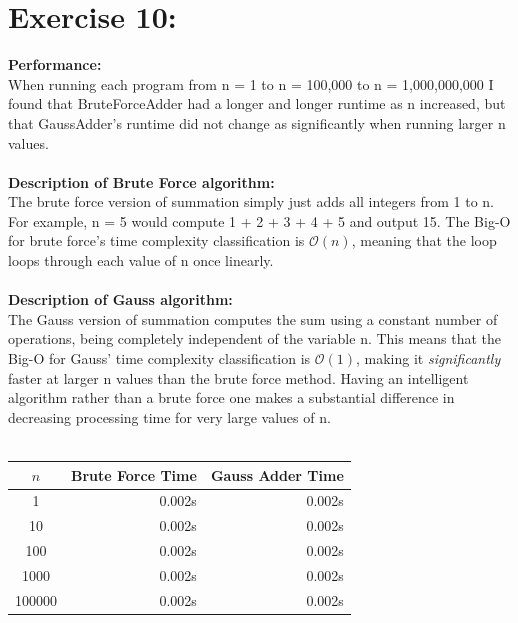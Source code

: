 \documentclass{article}
\begin{document}
\section{Exercise 10:}
\textbf{Performance: }\\
When running each program from n = 1 to n = 100,000 to n = 1,000,000,000 I found that BruteForceAdder had a longer and longer runtime as n increased, but that GaussAdder's runtime did not change as significantly when running larger n values.\\\\
\textbf{Description of Brute Force algorithm: }\\
The brute force version of summation simply just adds all integers from 1 to n. For example, n = 5 would compute 1 + 2 + 3 + 4 + 5 and output 15. The Big-O for brute force's time complexity classification is $\mathcal{O}(n)$, meaning that the loop loops through each value of n once linearly.\\\\
\textbf{Description of Gauss algorithm: }\\
The Gauss version of summation computes the sum using a constant number of operations, being completely independent of the variable n. This means that the Big-O for Gauss' time complexity classification is $\mathcal{O}(1)$, making it \textit{significantly} faster at larger n values than the brute force method. Having an intelligent algorithm rather than a brute force one makes a substantial difference in decreasing processing time for very large values of n.\\\\

\begin{center} \begin{tabular}{|c|r|r|}
\hline
$n$ & Brute Force Time & Gauss Adder Time \\
\hline
\hline
1 & 0.002s & 0.002s\\ \hline
10 & 0.002s & 0.002s\\ \hline
100 & 0.002s & 0.002s\\ \hline
1000 & 0.002s & 0.002s\\ \hline
100000 & 0.002s & 0.002s\\ \hline
\end{tabular} \end{center}
\newpage
\end{document}
